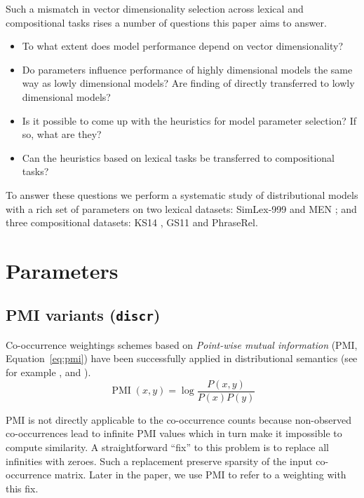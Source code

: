 \documentclass[11pt,letterpaper]{article}
\begin{document}
Such a mismatch in vector dimensionality selection across lexical and compositional tasks rises a number of questions this paper aims to answer.
\begin{itemize}
\item To what extent does model performance depend on vector dimensionality?
\item Do parameters influence performance of highly dimensional models the same way as lowly dimensional models? Are finding of  directly transferred to lowly dimensional models?
\item Is it possible to come up with the heuristics for model parameter selection? If so, what are they?
\item Can the heuristics based on lexical tasks be transferred to compositional tasks?
\end{itemize}

To answer these questions we perform a systematic study of distributional models with a rich set of parameters on two lexical datasets: SimLex-999 \cite{hill2014simlex} and MEN \cite{Bruni:2014:MDS:2655713.2655714}; and three compositional datasets: KS14 \cite{kartsadrqpl2014}, GS11 \cite{Grefenstette:2011:ESC:2145432.2145580} and PhraseRel.

\section{Parameters}
\label{sec:parameters}



\subsection{PMI variants (\texttt{discr})}
\label{sec:pmi-variants}

Co-occurrence weightings schemes based on \emph{Point-wise mutual information} (PMI, Equation~\ref{eq:pmi}) have been successfully applied in distributional semantics (see for example ,  and ).
%
\begin{equation}
  \label{eq:pmi}
  \operatorname{PMI}(x, y) = \log\frac{P(x,y)}{P(x)P(y)}
\end{equation}

PMI is not directly applicable to the co-occurrence counts because non-observed co-occurrences lead to infinite PMI values which in turn make it impossible to compute similarity. A straightforward ``fix'' to this problem is to replace all infinities with zeroes. Such a replacement preserve sparsity of the input co-occurrence matrix. Later in the paper, we use PMI to refer to a weighting with this fix.
\end{document}
